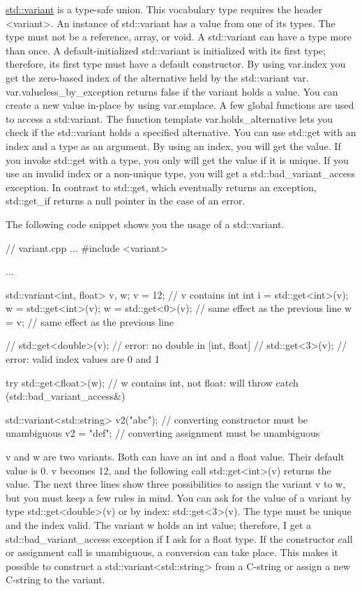 \href{http://en.cppreference.com/w/cpp/utility/variant}{std::variant} is a type-safe union. This vocabulary type requires the header <variant>. An instance of std::variant has a value from one of its types. The type must not be a reference, array, or void. A std::variant can have a type more than once. A default-initialized std::variant is initialized with its first type; therefore, its first type must have a default constructor. By using var.index you get the zero-based index of the alternative held by the std::variant var. var.valueless\_by\_exception returns false if the variant holds a value. You can create a new value in-place by using var.emplace. A few global functions are used to access a std:variant. The function template var.holds\_alternative lets you check if the std::variant holds a specified alternative. You can use std::get with an index and a type as an argument. By using an index, you will get the value. If you invoke std::get with a type, you only will get the value if it is unique. If you use an invalid index or a non-unique type, you will get a std::bad\_variant\_access exception. In contrast to std::get, which eventually returns an exception, std::get\_if returns a null pointer in the case of an error.

The following code snippet shows you the usage of a std::variant.


\begin{cpp}
// variant.cpp
...
#include <variant>

...

std::variant<int, float> v, w;
v = 12; // v contains int
int i = std::get<int>(v);
w = std::get<int>(v);
w = std::get<0>(v); // same effect as the previous line
w = v; // same effect as the previous line

// std::get<double>(v); // error: no double in [int, float]
// std::get<3>(v); // error: valid index values are 0 and 1

try{
	std::get<float>(w); // w contains int, not float: will throw
}
catch (std::bad_variant_access&) {}

std::variant<std::string> v2("abc"); // converting constructor must be unambiguous
v2 = "def"; // converting assignment must be unambiguous
\end{cpp}

v and w are two variants. Both can have an int and a float value. Their default value is 0. v becomes 12, and the following call std::get<int>(v) returns the value. The next three lines show three possibilities to assign the variant v to w, but you must keep a few rules in mind. You can ask for the value of a variant by type std::get<double>(v) or by index: std::get<3>(v). The type must be unique and the index valid. The variant w holds an int value; therefore, I get a std::bad\_variant\_access exception if I ask for a float type. If the constructor call or assignment call is unambiguous, a conversion can take place. This makes it possible to construct a std::variant<std::string> from a C-string or assign a new C-string to the variant.

